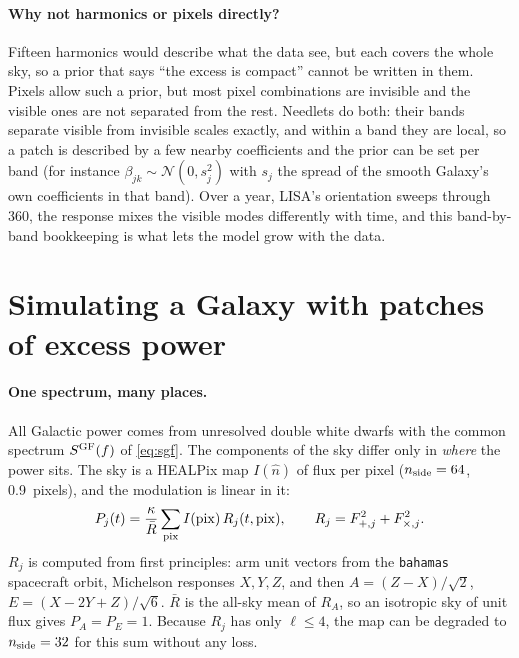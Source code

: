 \documentclass[11pt,a4paper]{article}
\begin{document}
\paragraph{Why not harmonics or pixels directly?} Fifteen harmonics would describe what
the data see, but each covers the whole sky, so a prior that says ``the excess is
compact'' cannot be written in them. Pixels allow such a prior, but most pixel
combinations are invisible and the visible ones are not separated from the rest.
Needlets do both: their bands separate visible from invisible scales exactly, and
within a band they are local, so a patch is described by a few nearby coefficients and
the prior can be set per band (for instance $\beta_{jk}\sim\mathcal N(0,s_j^2)$ with
$s_j$ the spread of the smooth Galaxy's own coefficients in that band). Over a year,
LISA's orientation sweeps through 360\textdegree, the response mixes the visible modes
differently with time, and this band-by-band bookkeeping is what lets the model grow
with the data.

\section{Simulating a Galaxy with patches of excess power}\label{sec:patchsim}

\paragraph{One spectrum, many places.} All Galactic power comes from unresolved
double white dwarfs with the common spectrum $S^{\rm GF}(f)$ of \cref{eq:sgf}. The
components of the sky differ only in \emph{where} the power sits. The sky is a HEALPix
map $I(\hat n)$ of flux per pixel ($n_{\rm side}=64$, 0.9\textdegree\ pixels), and the
modulation is linear in it:
\begin{equation}
  P_j(t) = \frac{\kappa}{\bar R}\sum_{\rm pix}I({\rm pix})\,R_j(t,{\rm pix}),\qquad
  R_j = F_{+,j}^2+F_{\times,j}^2 .
  \label{eq:Pmap}
\end{equation}
$R_j$ is computed from first principles: arm unit vectors from the \texttt{bahamas}
spacecraft orbit, Michelson responses $X,Y,Z$, and then
$A=(Z-X)/\sqrt2$, $E=(X-2Y+Z)/\sqrt6$. $\bar R$ is the all-sky mean of $R_A$, so an
isotropic sky of unit flux gives $P_A=P_E=1$. Because $R_j$ has only $\ell\le4$, the
map can be degraded to $n_{\rm side}=32$ for this sum without any loss.
\end{document}
